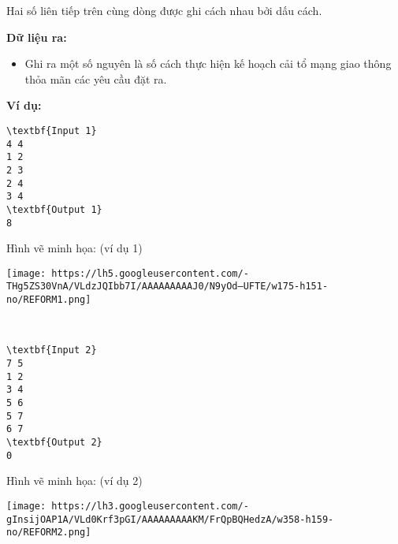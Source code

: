 Hai số liên tiếp trên cùng dòng được ghi cách nhau bởi dấu cách.

\textbf{Dữ liệu ra: }
\begin{itemize}
	\item Ghi ra một số nguyên là số cách thực hiện kế hoạch cải tổ mạng giao thông thỏa mãn các yêu cầu đặt ra.
\end{itemize}

\textbf{Ví dụ: }
\begin{verbatim}
\textbf{Input 1}
4 4
1 2
2 3
2 4
3 4
\textbf{Output 1}
8\end{verbatim}

Hình vẽ minh họa: (ví dụ 1)


\texttt{[image: https://lh5.googleusercontent.com/-THg5ZS30VnA/VLdzJQIbb7I/AAAAAAAAAJ0/N9yOd--UFTE/w175-h151-no/REFORM1.png]}

 
\begin{verbatim}
\textbf{Input 2}
7 5
1 2
3 4
5 6
5 7
6 7
\textbf{Output 2}
0\end{verbatim}

Hình vẽ minh họa: (ví dụ 2)


\texttt{[image: https://lh3.googleusercontent.com/-gInsijOAP1A/VLd0Krf3pGI/AAAAAAAAAKM/FrQpBQHedzA/w358-h159-no/REFORM2.png]}
